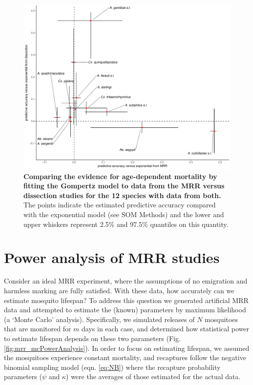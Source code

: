 \documentclass[12pt]{article}
\begin{document}
\begin{figure}[ht]
	\centerline{\includegraphics[width=1\textwidth]{./Figure_files/elpd_comparison.pdf}}
	\caption{\textbf{Comparing the evidence for age-dependent mortality by fitting the Gompertz model to data from the MRR versus dissection studies for the 12 species with data from both.} The points indicate the estimated predictive accuracy compared with the exponential model (see SOM Methods) and the lower and upper whiskers represent 2.5\% and 97.5\% quantiles on this quantity.}\label{fig:elpd_comparison}
\end{figure}



\section{Power analysis of MRR studies}
Consider an ideal MRR experiment, where the assumptions of no emigration and harmless marking are fully satisfied. With these data, how accurately can we estimate mosquito lifespan? To address this question we generated artificial MRR data and attempted to estimate the (known) parameters by maximum likelihood (a `Monte Carlo' analysis). Specifically, we simulated releases of $N$ mosquitoes that are monitored for $m$ days in each case, and determined how statistical power to estimate lifespan depends on these two parameters (Fig. \ref{fig:mrr_mcPowerAnalysis}). In order to focus on estimating lifespan, we assumed the mosquitoes experience constant mortality, and recaptures follow the negative binomial sampling model (eqn. \ref{eq:NB}) where the recapture probability parameters ($\psi$ and $\kappa$) were the averages of those estimated for the actual data.
\end{document}
